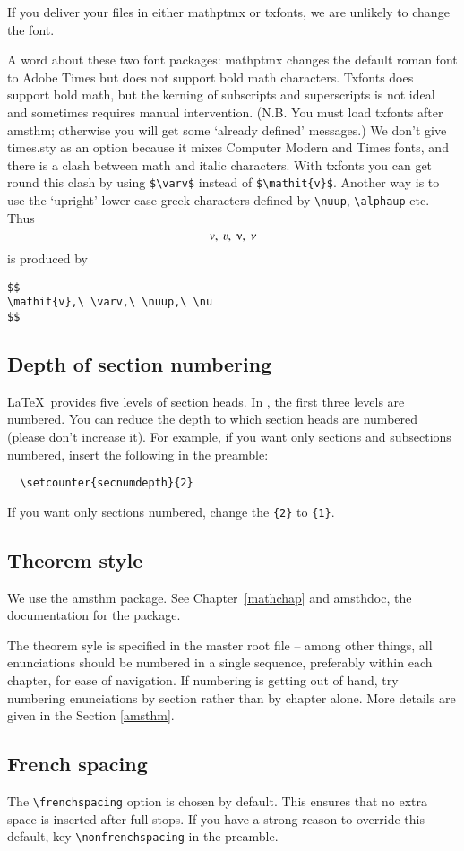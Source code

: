 If you deliver your files in either mathptmx or txfonts, we are
unlikely to change the font.

A word about these two font packages: mathptmx changes the default roman font to Adobe Times but does not
support bold math characters. Txfonts does support bold math,
but the kerning of subscripts and superscripts is not ideal and
sometimes requires manual intervention. (N.B. You must load txfonts after amsthm;
otherwise you will get some `already defined' messages.)
We don't give times.sty as an option because it mixes Computer Modern
and Times fonts, and there is a clash between math and italic characters. With txfonts you can get round this clash by using
\verb"$\varv$" instead of \verb"$\mathit{v}$". Another way is to use
 the `upright' lower-case greek characters defined by 
\verb"\nuup", \verb"\alphaup" etc. Thus
$$
\mathit{v},\ \varv,\ \nuup,\ \nu
$$
is produced by
\begin{verbatim}
$$
\mathit{v},\ \varv,\ \nuup,\ \nu
$$
\end{verbatim}


\subsection{Depth of section numbering}
\LaTeX\ provides five levels of section heads. In {\cambridge},
the first three levels are numbered. You can reduce the depth to which
section heads are numbered (please don't increase it).
For example, if you want only sections and subsections numbered,
insert the following in the preamble:
\begin{verbatim}
  \setcounter{secnumdepth}{2}
\end{verbatim}
If you want only sections numbered, change the \verb"{2}" to \verb"{1}".

\subsection{Theorem style}
We use the amsthm package. See Chapter~\ref{mathchap} and amsthdoc,
the documentation for the package.

The theorem syle is specified in the master root file -- among other things,
all enunciations should be numbered in a single sequence, preferably
within each chapter, for ease of navigation. If numbering is getting out of
hand, try numbering enunciations by section rather than by chapter alone.
More details are given in the Section \ref{amsthm}.

\subsection{French spacing}
The  \verb"\frenchspacing" option is chosen by default.
This ensures that no extra space is inserted after full stops.
If you have a strong reason to override this default, key \verb"\nonfrenchspacing" in the preamble.

